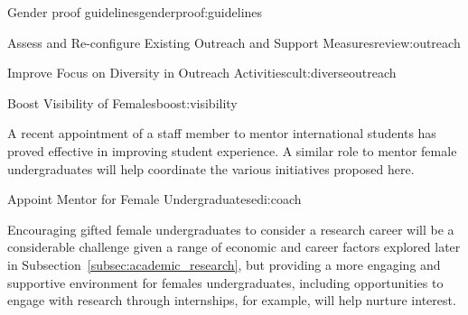 \begin{actionblock}{\ksspace{}Gender proof guidelines}{genderproof:guidelines}
\actgenderproof
\hfill{
    \hypersetup{hidelinks}
    \hyperlink{b1}{\gotoactionsymbol{}}
}
\end{actionblock}

\begin{actionblock}{\ksspace{}Assess and Re-configure
Existing Outreach and Support Measures}{review:outreach}
\actreviewactivities
\hfill{
    \hypersetup{hidelinks}
    \hyperlink{b2}{\gotoactionsymbol{}}
}
\end{actionblock}




\begin{actionblock}{\ksspace{}Improve Focus on Diversity in Outreach Activities}{cult:diverseoutreach}
\actreviseoutreachpractice
\hfill{
    \hypersetup{hidelinks}
    \hyperlink{b6}{\gotoactionsymbol{}}
}
\end{actionblock}


\begin{actionblock}{\ksspace{}Boost Visibility of Females}{boost:visibility}
\actboostvisibility
\hfill{
    \hypersetup{hidelinks}
    \hyperlink{b3}{\gotoactionsymbol{}}
}
\end{actionblock}

A recent appointment of a staff member to mentor international students
has proved effective in improving student experience. A similar role 
to mentor female undergraduates will help coordinate the various initiatives
proposed here.


\begin{actionblock}{\ksspace{}Appoint Mentor for Female Undergraduates}{edi:coach}
\actappointmentor
\hfill{
    \hypersetup{hidelinks}
    \hyperlink{b4}{\gotoactionsymbol{}}
}
\end{actionblock}


Encouraging gifted female undergraduates to consider a research career 
will be a considerable challenge given a range of economic and career 
factors explored later in Subsection~\ref{subsec:academic_research}, 
but providing a more engaging and supportive environment for females 
undergraduates, including opportunities to engage with research through 
internships, for example, will help nurture interest. 


